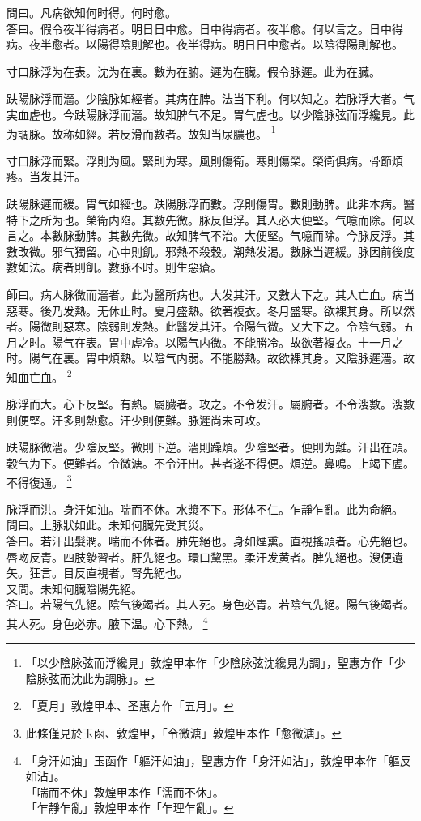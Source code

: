 問曰。凡病欲知何时得。何时愈。\\
答曰。假令夜半得病者。明日日中愈。日中得病者。夜半愈。何以言之。日中得病。夜半愈者。以陽得陰則解也。夜半得病。明日日中愈者。以陰得陽則解也。

寸口脉浮为在表。沈为在裏。數为在腑。遲为在臓。假令脉遲。此为在臓。

趺陽脉浮而濇。少陰脉如經者。其病在脾。法当下利。何以知之。若脉浮大者。气実血虗也。今趺陽脉浮而濇。故知脾气不足。胃气虗也。以少陰脉弦而浮纔見。此为調脉。故称如經。若反滑而數者。故知当尿膿也。
	\footnote{「以少陰脉弦而浮纔見」敦煌甲本作「少陰脉弦沈纔見为調」，聖惠方作「少陰脉弦而沈此为調脉」。}

寸口脉浮而緊。浮則为風。緊則为寒。風則傷衛。寒則傷榮。榮衛俱病。骨節煩疼。当发其汗。

趺陽脉遲而緩。胃气如經也。趺陽脉浮而數。浮則傷胃。數則動脾。此非本病。醫特下之所为也。榮衛内陷。其數先微。脉反但浮。其人必大便堅。气噫而除。何以言之。本數脉動脾。其數先微。故知脾气不治。大便堅。气噫而除。今脉反浮。其數改微。邪气獨留。心中則飢。邪熱不殺穀。潮熱发渴。數脉当遲緩。脉因前後度數如法。病者則飢。數脉不时。則生惡瘡。

師曰。病人脉微而濇者。此为醫所病也。大发其汗。又數大下之。其人亡血。病当惡寒。後乃发熱。无休止时。夏月盛熱。欲著複衣。冬月盛寒。欲裸其身。所以然者。陽微則惡寒。陰弱則发熱。此醫发其汗。令陽气微。又大下之。令陰气弱。五月之时。陽气在表。胃中虗冷。以陽气内微。不能勝冷。故欲著複衣。十一月之时。陽气在裏。胃中煩熱。以陰气内弱。不能勝熱。故欲裸其身。又陰脉遲濇。故知血亡血。
	\footnote{「夏月」敦煌甲本、圣惠方作「五月」。}

脉浮而大。心下反堅。有熱。屬臓者。攻之。不令发汗。屬腑者。不令溲數。溲數則便堅。汗多則熱愈。汗少則便難。脉遲尚未可攻。

趺陽脉微濇。少陰反堅。微則下逆。濇則躁煩。少陰堅者。便則为難。汗出在頭。穀气为下。便難者。令微溏。不令汗出。甚者遂不得便。煩逆。鼻鳴。上竭下虗。不得復通。
	\footnote{此條僅見於玉函、敦煌甲，「令微溏」敦煌甲本作「愈微溏」。}

脉浮而洪。身汗如油。喘而不休。水漿不下。形体不仁。乍靜乍亂。此为命絕。\\
問曰。上脉狀如此。未知何臓先受其災。\\
答曰。若汗出髮潤。喘而不休者。肺先絕也。身如煙熏。直視搖頭者。心先絕也。唇吻反青。四肢漐習者。肝先絕也。環口黧黑。柔汗发黄者。脾先絕也。溲便遺矢。狂言。目反直視者。腎先絕也。\\
又問。未知何臓陰陽先絕。\\
答曰。若陽气先絕。陰气後竭者。其人死。身色必青。若陰气先絕。陽气後竭者。其人死。身色必赤。腋下温。心下熱。
	\footnote{「身汗如油」玉函作「軀汗如油」，聖惠方作「身汗如沾」，敦煌甲本作「軀反如沾」。\\「喘而不休」敦煌甲本作「濡而不休」。\\「乍靜乍亂」敦煌甲本作「乍理乍亂」。}

